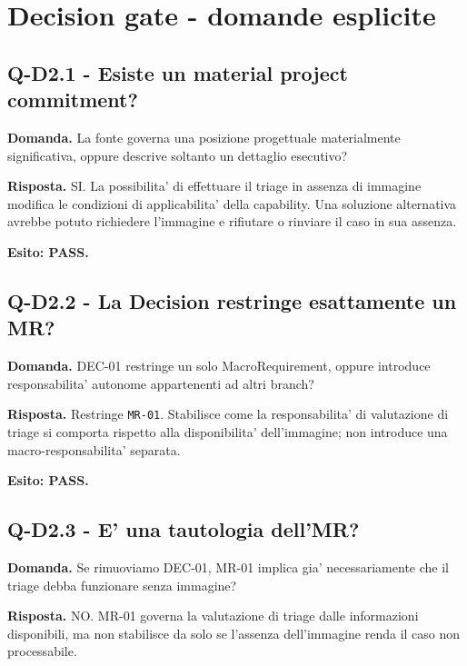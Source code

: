 \documentclass[11pt,a4paper]{article}
\begin{document}
\section{Decision gate - domande esplicite}

\subsection{Q-D2.1 - Esiste un material project commitment?}
\begin{ddtacheck}
\textbf{Domanda.} La fonte governa una posizione progettuale materialmente significativa, oppure descrive soltanto un dettaglio esecutivo?
\end{ddtacheck}

\textbf{Risposta.} SI. La possibilita' di effettuare il triage in assenza di immagine modifica le condizioni di applicabilita' della capability. Una soluzione alternativa avrebbe potuto richiedere l'immagine e rifiutare o rinviare il caso in sua assenza.

\textbf{Esito: PASS.}

\subsection{Q-D2.2 - La Decision restringe esattamente un MR?}
\begin{ddtacheck}
\textbf{Domanda.} DEC-01 restringe un solo MacroRequirement, oppure introduce responsabilita' autonome appartenenti ad altri branch?
\end{ddtacheck}

\textbf{Risposta.} Restringe \texttt{MR-01}. Stabilisce come la responsabilita' di valutazione di triage si comporta rispetto alla disponibilita' dell'immagine; non introduce una macro-responsabilita' separata.

\textbf{Esito: PASS.}

\subsection{Q-D2.3 - E' una tautologia dell'MR?}
\begin{ddtacheck}
\textbf{Domanda.} Se rimuoviamo DEC-01, MR-01 implica gia' necessariamente che il triage debba funzionare senza immagine?
\end{ddtacheck}

\textbf{Risposta.} NO. MR-01 governa la valutazione di triage dalle informazioni disponibili, ma non stabilisce da solo se l'assenza dell'immagine renda il caso non processabile.
\end{document}
